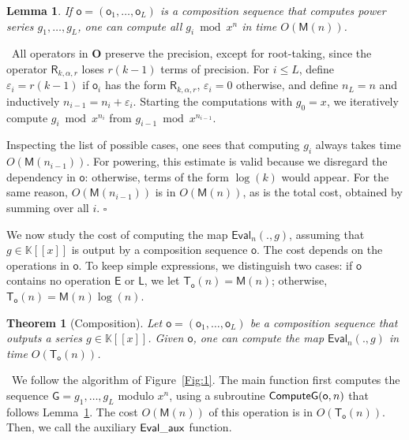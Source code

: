 \documentclass{sig-alternate}
\def\K {\ensuremath{\mathbb{K}}}
\def\M{\ensuremath{\mathsf{M}}}
\def\T{\ensuremath{\mathsf{T}}}
\def\op {\ensuremath{\mathbf{O}}}
\def\o {\ensuremath{\mathsf{o}}}
\def\g {\ensuremath{\mathsf{G}}}
\def\lg {\ensuremath{\mathsf{L}}}
\def\xp {\ensuremath{\mathsf{E}}}
\def\root {\ensuremath{\mathsf{R}}}
\def\Eval {\ensuremath{\mathsf{Eval}}}
\def\myproof{\noindent{\sc Proof.}~}
\def\foorp{\hfill$\square$}
\newtheorem{theorem}{Theorem}
\newtheorem{Lemma}{Lemma}
\begin{document}
\begin{Lemma}\label{Lemma:0}
  If $\o=(\o_1,\dots,\o_L)$ is a composition sequence that computes
  power series $g_1,\dots,g_L$, one can compute all $g_i \bmod x^n$ in
  time $O(\M(n))$.
\end{Lemma}
\myproof All operators in $\op$ preserve the precision, except for
root-taking, since the operator $\root_{k,\alpha,r}$ loses $r(k-1)$
terms of precision. For $i \le L$, define $\varepsilon_i = r(k-1)$ if
$\o_i$ has the form $\root_{k,\alpha,r}$, $\varepsilon_i = 0$
otherwise, and define $n_L=n$ and inductively $n_{i-1} = n_i +
\varepsilon_i$. Starting the computations with $g_0=x$, we iteratively
compute $g_{i} \bmod x^{n_{i}}$ from $g_{i-1} \bmod x^{n_{i-1}}$.

Inspecting the list of possible cases, one sees that computing $g_i$
always takes time $O(\M(n_{i-1}))$. For powering, this estimate is
valid because we disregard the dependency in $\o$: otherwise, terms of
the form $\log(k)$ would appear. For the same reason, $O(\M(n_{i-1}))$
is in $O(\M(n))$, as is the total cost, obtained by summing over all
$i$. \foorp

\smallskip{}  We
now study the cost of computing the map $\Eval_{n}(.,g)$, assuming that
$g \in \K[[x]]$ is output by a composition sequence $\o$. The cost
depends on the operations in $\o$. To keep simple expressions, we
distinguish two cases: if $\o$ contains no operation
$\xp$ or $\lg$, we let $\T_\o(n)=\M(n)$; otherwise, $\T_\o(n)=\M(n)\log(n)$.

\begin{theorem}[Composition]\label{Prop:0}
 Let $\o=(\o_1,\dots,\o_L)$ be a composition sequence that outputs a
 series $g \in \K[[x]]$. Given $\o$, one can compute the map
 $\Eval_{n}(.,g)$ in time $O(\T_\o(n))$.
\end{theorem}
\myproof We follow the algorithm of Figure~\ref{Fig:1}. The main
function first computes the sequence $\g=g_1,\dots,g_L$ modulo $x^n$,
using a subroutine ${\sf ComputeG}(\o, n)$ that follows
Lemma~\ref{Lemma:0}. The cost $O(\M(n))$ of this operation is in
$O(\T_\o(n))$. Then, we call the auxiliary $\Eval{\sf \_aux}$
function.
\end{document}
